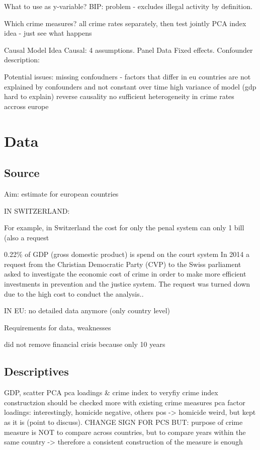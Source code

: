 \documentclass[a4paper,12pt]{article}
\begin{document}
What to use as y-variable?
BIP: problem - excludes illegal activity by definition.

Which crime measures?
all crime rates separately, then test jointly
PCA index idea - just see what happens


Causal Model Idea
Causal: 4 assumptions. 
Panel Data Fixed effects.
Confounder description: 

Potential issues: 
missing confoudners - factors that differ in eu countries are not explained by confounders and not constant over time
high variance of model (gdp hard to explain)
reverse causality
no sufficient heterogeneity in crime rates accross europe

\section{Data}
\label{Data}
\subsection{Source}
Aim: estimate for european countries

IN SWITZERLAND: 

For example, in Switzerland the cost for only the penal system can only 1 bill (also a request

0.22\% of GDP (gross domestic product) is spend on the court system
In 2014 a request from the Christian Democratic Party (CVP) to the Swiss parliament asked to investigate the economic cost of crime in order to make more efficient investments in prevention and the justice system. The request was turned down due to the high cost to conduct the analysis.\citep{postulat}.

IN EU: no detailed data anymore (only country level)

Requirements for data, weaknesses

did not remove financial crisis because only 10 years

\subsection{Descriptives}
GDP, 
scatter PCA
pca loadings \& crime index to veryfiy crime index constructzion
should be checked more with existing crime measures
pca factor loadings: interestingly, homicide negative, others pos -> homicide weird, but kept as it is (point to discuss). CHANGE SIGN FOR PCS
BUT: purpose of crime measure is NOT to compare across countries, but to compare years within the same country -> therefore a consistent construction of the measure is enough
\end{document}
